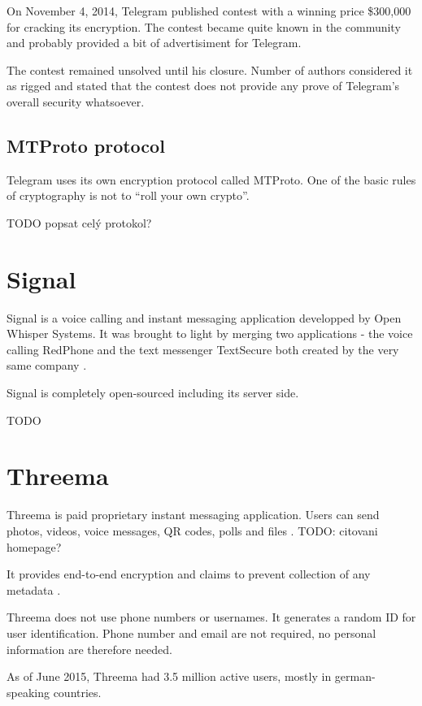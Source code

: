 \documentclass[thesis=M,english]{FITthesis}[2012/10/20]
\begin{document}
On November 4, 2014, Telegram published contest with a winning price \$300,000 for cracking its encryption. The contest became quite known in the community and probably provided a bit of advertisiment for Telegram.

The contest remained unsolved until his closure. Number of authors considered it as rigged and stated that the contest does not provide any prove of Telegram's overall security whatsoever.\cite{telegramcontestfail}\cite{telegramcontestfail2}

\subsection{MTProto protocol}

Telegram uses its own encryption protocol called MTProto. One of the basic rules of cryptography is not to ``roll your own crypto''.

TODO popsat celý protokol?


\section{Signal}

Signal is a voice calling and instant messaging application developped by Open Whisper Systems. It was brought to light by merging two applications - the voice calling RedPhone and the text messenger TextSecure both created by the very same company \cite{signalmerge}.

Signal is completely open-sourced including its server side.

TODO

\section{Threema}

Threema is paid proprietary instant messaging application. Users can send  photos, videos, voice messages, QR codes, polls and files \cite{threemahomepage}. TODO: citovani homepage?

It provides end-to-end encryption and claims to prevent collection of any metadata \cite{threemahomepage}.

Threema does not use phone numbers or usernames. It generates a random ID for user identification. Phone number and email are not required, no personal information are therefore needed.

As of June 2015, Threema had 3.5 million active users, mostly in german-speaking countries.\cite{threemausers}
\end{document}
